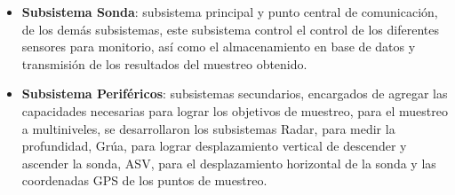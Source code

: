 \begin{itemize}
    \item \textbf{Subsistema Sonda}: subsistema principal y punto central de comunicaci\'on, de los dem\'as subsistemas, este subsistema control el control de los diferentes sensores para monitorio, as\'i como el almacenamiento en base de datos y transmisión de los resultados del muestreo obtenido.
    \item \textbf{Subsistema Perif\'ericos}: subsistemas secundarios, encargados de agregar las capacidades necesarias para lograr los objetivos de muestreo, para el muestreo a multiniveles, se desarrollaron los subsistemas Radar, para medir la profundidad, Gr\'ua, para lograr desplazamiento vertical de descender y ascender la sonda, ASV, para el desplazamiento horizontal de la sonda y las coordenadas GPS de los puntos de  muestreo. 
\end{itemize}

